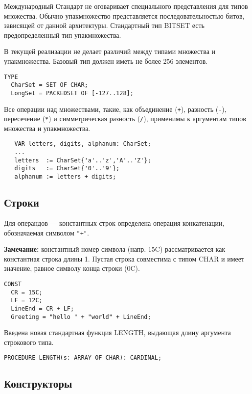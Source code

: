 Международный Стандарт не оговаривает специального представления для
типов множества. Обычно упакмножество представляется последовательностью 
битов, зависящей от данной архитектуры. Стандартный тип 
BITSET есть предопределенный тип упакмножества.

В текущей реализации \xds{} не делает различий между типами
множества и упакмножества. Базовый тип должен иметь не более
256 элементов. 

\Example
\begin{verbatim}
TYPE
  CharSet = SET OF CHAR;
  LongSet = PACKEDSET OF [-127..128];
\end{verbatim}

Все операции над множествами, такие, как объединение
(\verb|+|), разность (\verb|-|),
пересечение (\verb|*|) и симметрическая разность (\verb|/|),
применимы к аргументам типов множества и упакмножества.

\Example
\begin{verbatim}
   VAR letters, digits, alphanum: CharSet;
   ...
   letters  := CharSet{'a'..'z','A'..'Z'};
   digits   := CharSet{'0'..'9'};
   alphanum := letters + digits;
\end{verbatim}

\subsection{Строки}\label{m2:ISO:strings}

Для операндов --- константных 
строк определена операция конкатенации,
обозначаемая символом \verb|"+"|. 

{\bf Замечание:} константный номер символа
(напр. 15C) рассматривается как константная строка длины 1.
Пустая строка совместима с типом
CHAR и имеет значение, равное символу конца строки (0C).

\Example
\begin{verbatim}
CONST
  CR = 15C;
  LF = 12C;
  LineEnd = CR + LF;
  Greeting = "hello " + "world" + LineEnd;
\end{verbatim}

Введена новая стандартная функция LENGTH, выдающая длину аргумента
строкового типа.

\begin{verbatim}
PROCEDURE LENGTH(s: ARRAY OF CHAR): CARDINAL;
\end{verbatim}

\subsection{Конструкторы}\label{m2:ISO:aggregates}

